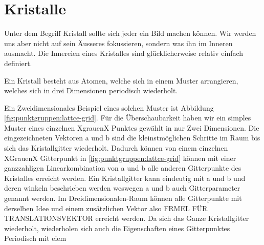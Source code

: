 \section{Kristalle}
Unter dem Begriff Kristall sollte sich jeder ein Bild machen können. 
Wir werden uns aber nicht auf sein Äusseres fokussieren, sondern was ihn im Inneren ausmacht.
Die Innereien eines Kristalles sind glücklicherweise relativ einfach definiert.
\begin{definition}[Kristall]
    Ein Kristall besteht aus Atomen, welche sich in einem Muster arrangieren, welches sich in drei Dimensionen periodisch wiederholt.
\end{definition}


Ein Zweidimensionales Beispiel eines solchen Muster ist Abbildung \ref{fig:punktgruppen:lattce-grid}.
Für die Überschaubarkeit haben wir ein simples Muster eines einzelnen XgrauenX Punktes gewählt in nur Zwei Dimensionen.
Die eingezeichneten Vektoren a und b sind die kleinstmöglichen Schritte im Raum bis sich das Kristallgitter wiederholt.
Dadurch können von einem einzelnen XGrauenX Gitterpunkt in \ref{fig:punktgruppen:lattce-grid} können mit einer ganzzahligen Linearkombination von a und b alle anderen Gitterpunkte des Kristalles erreicht werden.
Ein Kristallgitter kann eindeutig mit a und b und deren winkeln beschrieben werden weswegen a und b auch Gitterparameter genannt werden.
Im Dreidimensionalen-Raum können alle Gitterpunkte mit derselben Idee und einem zusätzlichen Vektor also FRMEL FÜR TRANSLATIONSVEKTOR  erreicht werden.
Da sich das Ganze Kristallgitter wiederholt, wiederholen sich auch die Eigenschaften eines Gitterpunktes Periodisch mit eiem
